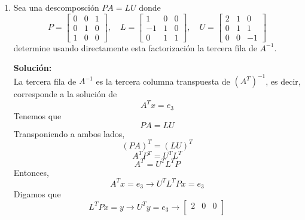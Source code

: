 \documentclass[12pt]{article}
\newenvironment{solucion}
{\begin{mdframed}[backgroundcolor=black!10]
		{\bf Solución:}\\
	}
	{
	\end{mdframed}
}
\newenvironment{preguntas}
{\begin{enumerate}\itemsep12pt
	}
	{
	\end{enumerate}
}
\newcommand{\ra}{\rightarrow}
\begin{document}
\begin{preguntas}
\begin{solucion}
		Procedamos a construir $L$. Lo que haremos será dividir cada vector seleccionado anteriormente por el coeficiente que está más arriba (pivote) y usar cada vector resultante como una columna de $L$. De esta manera,
		$$ L = \begin{bmatrix}
		1 & 0 & 0 & 0 \\
		-2 & 1 & 0 & 0 \\
		1 & -3 & 1 & 0 \\
		3 & 4 & 2 & 1
		\end{bmatrix}$$
		Finalmente,
		$$A = \begin{bmatrix}
		1 & 0 & 0 & 0 \\
		-2 & 1 & 0 & 0 \\
		1 & -3 & 1 & 0 \\
		3 & 4 & 2 & 1
		\end{bmatrix} \begin{bmatrix}
		2 & 4 & -1 & 5 & -2 \\
		0 & 3 & 1 & 2 & -3 \\
		0 & 0 & 0 & 2 & 1 \\
		0 & 0 & 0 & 0 & 5
		\end{bmatrix}$$
\end{solucion}
\item Sea una descomposción $PA = LU$ donde
	$$P = \begin{bmatrix}
	0 & 0 & 1\\
	0 & 1 & 0\\
	1 & 0 & 0
	\end{bmatrix}, \quad
	L = \begin{bmatrix}
	1 & 0 & 0\\
	-1 & 1 & 0\\
	0 & 1 & 1
	\end{bmatrix}, \quad
	U = \begin{bmatrix}
	2 & 1 & 0\\
	0 & 1 & 1\\
	0 & 0 & -1
	\end{bmatrix}$$
	determine usando directamente esta factorización la tercera fila de $A^{-1}$.
\begin{solucion}
La tercera fila de $A^{-1}$ es la tercera columna transpuesta de $(A^T)^{-1}$, es decir, corresponde a la solución de
		$$A^Tx = e_3$$
		Tenemos que
		$$PA = LU$$
		Transponiendo a ambos lados,
		$$(PA)^T = (LU)^T$$
		$$A^TP^T = U^TL^T$$
		$$A^T = U^TL^TP$$
		Entonces,
		$$A^Tx = e_3 \ra U^TL^TPx = e_3$$
		Digamos que
		$$L^TPx = y \ra U^Ty = e_3 \ra \begin{bmatrix}
		2 & 0 & 0\\

\end{bmatrix}$$
\end{solucion}
\end{preguntas}
\end{document}
